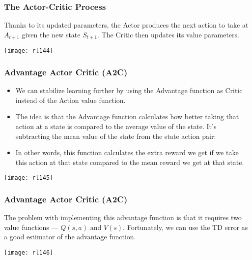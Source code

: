 \begin{frame}[fragile]\frametitle{The Actor-Critic Process}

Thanks to its updated parameters, the Actor produces the next action to take at $A_{t+1}$  given the new state $S_{t+1}$. The Critic then updates its value parameters.	
\begin{center}
\texttt{[image: rl144]}
\end{center}
\end{frame}


\begin{frame}[fragile]\frametitle{Advantage Actor Critic (A2C)}

\begin{itemize}
\item We can stabilize learning further by using the Advantage function as Critic instead of the Action value function.
\item The idea is that the Advantage function calculates how better taking that action at a state is compared to the average value of the state. It’s subtracting the mean value of the state from the state action pair:
\item In other words, this function calculates the extra reward we get if we take this action at that state compared to the mean reward we get at that state.
\end{itemize}


\begin{center}
\texttt{[image: rl145]}
\end{center}



\end{frame}

\begin{frame}[fragile]\frametitle{Advantage Actor Critic (A2C)}

The problem with implementing this advantage function is that it requires two value functions — $Q(s,a)$ and $V(s)$. Fortunately, we can use the TD error as a good estimator of the advantage function.

\begin{center}
\texttt{[image: rl146]}
\end{center}


\end{frame}


